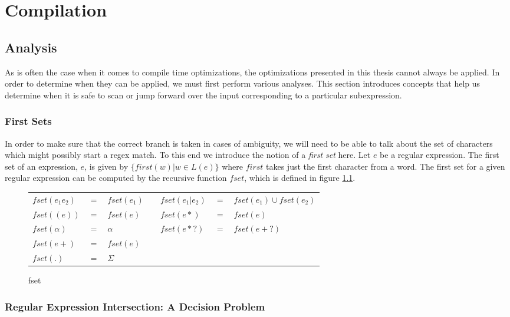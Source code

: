 \chapter{Compilation}
\label{chapter:compilation}

\section{Analysis}

As is often the case when it comes to compile time optimizations,
the optimizations presented in this thesis cannot always be
applied. In order to determine when they can be applied, we must
first perform various analyses. This section introduces concepts
that help us determine when it is safe to scan or jump forward over the
input corresponding to a particular subexpression.

\subsection{First Sets}

In order to make sure that the correct branch is taken in cases of
ambiguity, we will need to be able to talk about the set of characters
which might possibly start a regex match. To this end we introduce the
notion of a \emph{first set} here. Let $e$ be a regular expression.
The first set of an expression, $e$, is given by
$\{first(w) \rvert w \in L(e)\}$ where $first$ takes just the first
character from a word. The first set for a given
regular expression can be computed by the recursive function $fset$,
which is defined in figure \ref{fig:fsetdef}.

\begin{figure}
\label{fig:fsetdef}
\caption{fset}
\centering

\begin{tabular}{l c l c l c l}
$fset(e_1 e_2)$ & $=$ & $fset(e_1)$ & &
  $fset(e_1 \rvert e_2)$ & $=$ & $fset(e_1) \cup fset(e_2)$ \\
$fset((e))$ & $=$ & $fset(e)$ & &
  $fset(e*)$ & $=$ & $fset(e)$ \\
$fset(\alpha)$ & $=$ & $\alpha$ & &
  $fset(e*?)$ & $=$ & $fset(e+?)$ \\
$fset(e+)$ & $=$ & $fset(e)$ & & & & \\
$fset(.)$ & $=$ & $\Sigma$ & & & & \\
\end{tabular}
\end{figure}

\subsection{Regular Expression Intersection: A Decision Problem}
\label{section:regexinterdecide}

